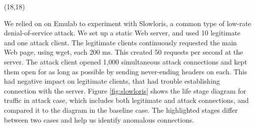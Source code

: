 \documentclass{article}
\def\redhead#1{\begin{center}\noindent{\LARGE\color{red} #1}\end{center}}
\renewcommand{\LARGE}{\fontsize{43}{54}\selectfont}
\begin{document}
\begin{textblock}{8}(18,18)
	\begin{tcolorbox}[boxsep=12pt, colback=red!10!white, colframe=red!80!white]
\redhead{Preliminary Results}

We relied on on Emulab to experiment with Slowloris, a common type of low-rate denial-of-service attack. We set up a static Web server, and used 10 legitimate and one attack client. The legitimate clients continuously requested the main Web page, using wget, each 200 ms. This created 50 requests per second at the server. The attack client opened 1,000 simultaneous attack connections and kept them open for as long as possible by sending never-ending headers on each. This had negative impact on legitimate clients, that had trouble establishing connection with the server. Figure \ref{fig:slowloris} shows the life stage diagram for traffic in attack case, which includes both legitimate
and attack connections, and compared it to the diagram in the baseline case. The highlighted stages differ between two cases and help us identify anomalous connections.
	\end{tcolorbox}
\end{textblock}
\end{document}

